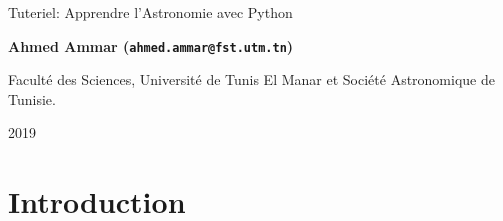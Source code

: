 \documentclass[%
oneside,                 %
final,                   %
10pt,french]{article}
\begin{document}

\newcommand{\exercisesection}[1]{\subsection*{#1}}






\thispagestyle{empty}

\begin{center}
{\LARGE\bf
\begin{spacing}{1.25}
Tuteriel: Apprendre l'Astronomie avec Python
\end{spacing}
}
\end{center}


\begin{center}
{\bf Ahmed Ammar (\texttt{ahmed.ammar@fst.utm.tn})}
\end{center}

    \begin{center}
\centerline{{\small Faculté des Sciences, Université de Tunis El Manar et Société Astronomique de Tunisie.}}
\end{center}
    

\begin{center}
2019
\end{center}

\vspace{1cm}


\tableofcontents


\vspace{1cm} %




\section{Introduction}

\end{document}
